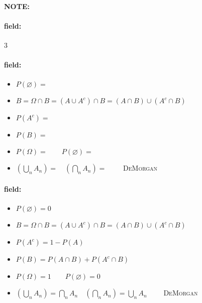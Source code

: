 \documentclass[12pt]{article}
\newenvironment{note}{\paragraph{NOTE:}}{}
\newenvironment{field}{\paragraph{field:}}{}
\begin{document}
\begin{note}
  \begin{field}
    \tiny 3
  \end{field}
  \begin{field}
    \begin{itemize}
  \item $P(\varnothing) = $
  \item $B = \Omega \cap B = (A \cup A^c) \cap B
    = (A \cap B) \cup (A^c \cap B)$
  \item $P(A^c) = $
  \item $P(B) = $
  \item $P(\Omega) =  \qquad P(\varnothing) = $
  \item $\left(\bigcup_n A_n\right) =
    \quad
    \left(\bigcap_n A_n\right) =
    \qquad$
    \textsc{DeMorgan}
\end{itemize}
  \end{field}
  \begin{field}
    \begin{itemize}
  \item $P(\varnothing) = 0$
  \item $B = \Omega \cap B = (A \cup A^c) \cap B
    = (A \cap B) \cup (A^c \cap B)$
  \item $P(A^c) = 1 - P(A)$
  \item $P(B) = P(A \cap B) + P(A^c \cap B)$
  \item $P(\Omega) = 1 \qquad P(\varnothing) = 0$
  \item $\left(\bigcup_n A_n\right) = \bigcap_n A_n
    \quad
    \left(\bigcap_n A_n\right) = \bigcup_n A_n
    \qquad$
    \textsc{DeMorgan}
\end{itemize}
  \end{field}
\end{note}
\end{document}
